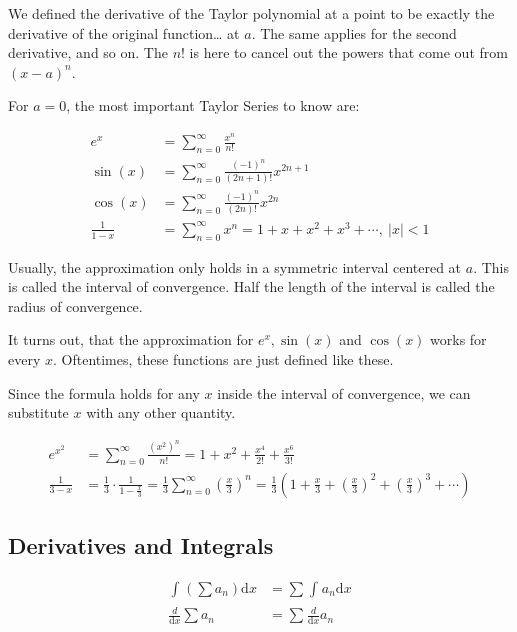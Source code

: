 \documentclass[12pt]{article}
\theoremstyle{plain}
\theoremstyle{remark}
\theoremstyle{definition}
\begin{document}
We defined the derivative of the Taylor polynomial at a point to be
exactly the derivative of the original function\ldots{} at \(a\). The
same applies for the second derivative, and so on. The \(n!\) is here to
cancel out the powers that come out from \((x - a)^{n}\).

For \(a = 0\), the most important Taylor Series to know are:

\begin{align*}
e^{x} &= \sum_{n = 0}^{\infty}\frac{x^{n}}{n!} \\
\sin(x) &= \sum_{n = 0}^{\infty}{\frac{( - 1)^{n}}{(2n + 1)!}x^{2n + 1}} \\
\cos(x) &= \sum_{n = 0}^{\infty}{\frac{( - 1)^{n}}{(2n)!}x^{2n}} \\
\frac{1}{1 - x} &= \sum_{n = 0}^{\infty}x^{n} = 1 + x + x^{2} + x^{3} + \cdots,\ |x| < 1
\end{align*}


Usually, the approximation only holds in a symmetric interval centered
at \(a\). This is called the interval of convergence. Half the length of
the interval is called the radius of convergence.

It turns out, that the approximation for \(e^{x},\sin(x)\) and
\(\cos(x)\) works for every \(x\). Oftentimes, these functions are just
defined like these.

Since the formula holds for any \(x\) inside the interval of
convergence, we can substitute \(x\) with any other quantity.

\begin{align*}
e^{x^{2}} &= \sum_{n = 0}^{\infty}\frac{\left( x^{2} \right)^{n}}{n!} = 1 + x^{2} + \frac{x^{4}}{2!} + \frac{x^{6}}{3!} \\
\frac{1}{3 - x} &= \frac{1}{3} \cdot \frac{1}{1 - \frac{x}{3}} = \frac{1}{3}\sum_{n = 0}^{\infty}\left( \frac{x}{3} \right)^{n} = \frac{1}{3}\left( 1 + \frac{x}{3} + \left( \frac{x}{3} \right)^{2} + \left( \frac{x}{3} \right)^{3} + \cdots \right)
\end{align*}



\subsection{Derivatives and Integrals}

\begin{align*}
\int_{}^{}{\left( \sum a_{n} \right)\text{d}x} &= \sum_{}^{}{\int_{}^{}{a_{n}\text{d}x}} \\
\frac{d}{\text{d}x}\sum a_{n} &= \sum_{}^{}{\frac{d}{\text{d}x}a_{n}}
\end{align*}
\end{document}
